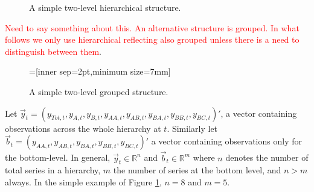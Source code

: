 \documentclass[graybox]{svmult}
\begin{document}
\begin{figure}[!hbt]  \center
  \caption{A simple two-level hierarchical structure.}
  \label{fig:simple tree}
\end{figure}

\textcolor{red}{Need to say something about this. An alternative structure is grouped. In what follows we only use hierarchical reflecting also grouped unless there is a need to distinguish between them}.

\begin{figure}[!hbt]
\center
{}=[inner sep=2pt,minimum size=7mm]
  \caption{A simple two-level grouped structure.}
  \label{fig:simple grouped tree}
\end{figure}



Let $\vec{y}_t = (y_{Tot,t},y_{A,t}, y_{B,t},y_{AA,t}, y_{AB,t}, y_{BA,t}, y_{BB,t},y_{BC,t})'$, a vector containing observations across the whole hierarchy at $t$. Similarly let $\vec{b}_t = (y_{AA,t}, y_{AB,t}, y_{BA,t}, y_{BB,t}, y_{BC,t})'$ a vector containing observations only for the bottom-level. In general, $\vec{y}_t\in \mathbb{R}^n$ and $\vec{b}_t \in \mathbb{R}^m$ where $n$ denotes the number of total series in a hierarchy, $m$ the number of series at the bottom level, and $n>m$ always. In the simple example of Figure \ref{fig:simple tree}, $n=8$ and $m=5$.
\end{document}
